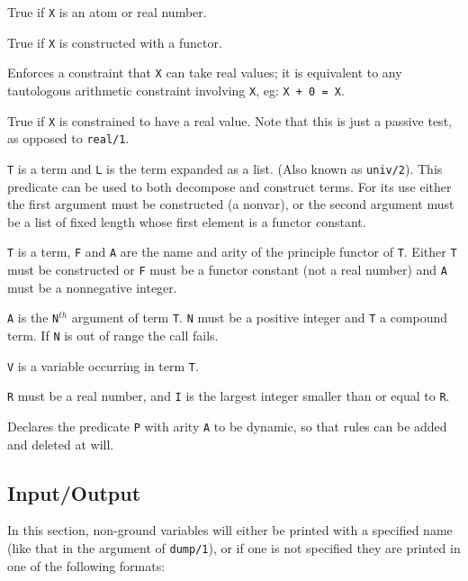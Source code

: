 \begin{description}
True if {\tt X} is an atom or real number.

True if {\tt X} is constructed with a functor.

Enforces a constraint that {\tt X} can take real values;
it is equivalent to any tautologous arithmetic constraint
involving {\tt X}, eg: {\tt X + 0 = X}. 

True if {\tt X} is constrained to have a real value.
Note that this is just a passive test, as opposed to {\tt real/1}.

{\tt T} is a term and {\tt L} is the term expanded as a list. 
(Also known as {\tt univ/2}).  This predicate can be used to both
decompose and construct terms.  For its use either 
the first argument must be constructed
(a nonvar), or the second argument
must be a list of fixed length whose first element is a functor constant.

\chgbarbegin
{}
{\tt T} is a term, {\tt F} and {\tt A} are the name and
arity of the principle functor of {\tt T}.  Either {\tt T} must be
constructed or {\tt F} must be a functor constant (not a real number)
and {\tt A} must be a nonnegative integer.

{\tt A} is the {\tt N}$^{th}$ argument of term {\tt T}.
{\tt N} must be a positive integer and {\tt T} a compound term.
If {\tt N} is out of range the call fails.
\chgbarend

{\tt V} is a variable occurring in term {\tt T}.

{\tt R} must be a real number, and
{\tt I} is the largest integer smaller than or equal to {\tt R}.

Declares the predicate {\tt P} with arity {\tt A} to be dynamic, 
so that rules
can be added and deleted at will.

\end{description}

\subsection{Input/Output}

In this section,
non-ground variables will either be printed with a specified name
(like that in the argument of {\tt dump/1}),
or if one is not specified they are printed in one of the following formats:

